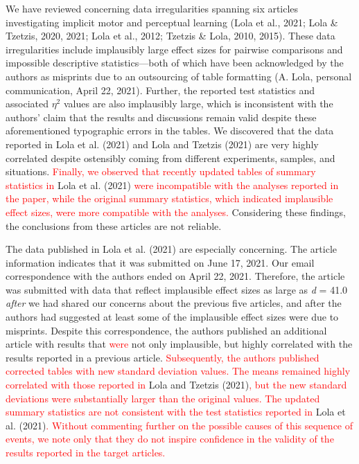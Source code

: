 \documentclass[
  english,
  man, donotrepeattitle,floatsintext]{apa7}
\begin{document}
We have reviewed concerning data irregularities spanning six articles investigating implicit motor and perceptual learning (Lola et al., 2021; Lola \& Tzetzis, 2020, 2021; Lola et al., 2012; Tzetzis \& Lola, 2010, 2015). These data irregularities include implausibly large effect sizes for pairwise comparisons and impossible descriptive statistics---both of which have been acknowledged by the authors as misprints due to an outsourcing of table formatting (A. Lola, personal communication, April 22, 2021). Further, the reported test statistics and associated \(\eta^{2}\) values are also implausibly large, which is inconsistent with the authors' claim that the results and discussions remain valid despite these aforementioned typographic errors in the tables. We discovered that the data reported in Lola et al. (2021) and Lola and Tzetzis (2021) are very highly correlated despite ostensibly coming from different experiments, samples, and situations. \textcolor{red}{Finally, we observed that recently updated tables of summary statistics in} Lola et al. (2021) \textcolor{red}{were incompatible with the analyses reported in the paper, while the original summary statistics, which indicated implausible effect sizes, were more compatible with the analyses.} Considering these findings, the conclusions from these articles are not reliable.

The data published in Lola et al. (2021) are especially concerning. The article information indicates that it was submitted on June 17, 2021. Our email correspondence with the authors ended on April 22, 2021. Therefore, the article was submitted with data that reflect implausible effect sizes as large as \emph{d} = 41.0 \emph{after} we had shared our concerns about the previous five articles, and after the authors had suggested at least some of the implausible effect sizes were due to misprints. Despite this correspondence, the authors published an additional article with results that \textcolor{red}{were} not only implausible, but highly correlated with the results reported in a previous article. \textcolor{red}{Subsequently, the authors published corrected tables with new standard deviation values. The means remained highly correlated with those reported in} Lola and Tzetzis (2021)\textcolor{red}{, but the new standard deviations were substantially larger than the original values. The updated summary statistics are not consistent with the test statistics reported in} Lola et al. (2021)\textcolor{red}{. Without commenting further on the possible causes of this sequence of events, we note only that they do not inspire confidence in the validity of the results reported in the target articles.}
\end{document}
